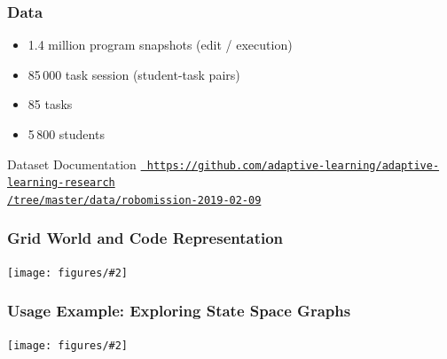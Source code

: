 \documentclass[bigger]{beamer}
\newcommand{\img}[2]{
  \begin{center}
    \texttt{[image: figures/\#2]}
  \end{center}
}
\begin{document}
\begin{frame}
  \frametitle{Data}


  \begin{itemize}
  \item 1.4 million program snapshots  (edit / execution) %
  \item 85\,000 task session (student-task pairs)  %
  \item 85 tasks
  \item 5\,800 students  %
  \end{itemize}

  \bigskip
  \begin{block}{Dataset Documentation}
  \scriptsize{%
    \href{https://github.com/adaptive-learning/adaptive-learning-research/tree/master/data/robomission-2019-02-09}{\texttt{%
    https://github.com/adaptive-learning/adaptive-learning-research\\
    /tree/master/data/robomission-2019-02-09}}}
  \end{block}


\end{frame}

\begin{frame}
  \frametitle{Grid World and Code Representation}

  \img{1.}{task-setting-solution}

\end{frame}


\begin{frame}
  \frametitle{Usage Example: Exploring State Space Graphs}

  \img{1.}{statespace-clean-path}

\end{frame}
\end{document}
